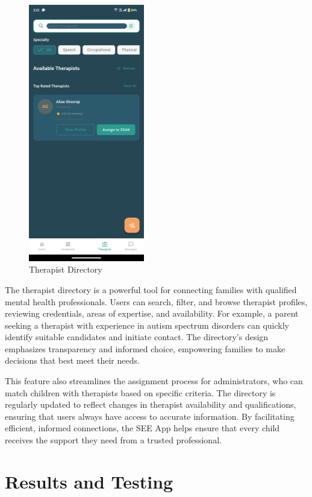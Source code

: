 \documentclass[12pt,a4paper]{article}
\newcommand{\chaptertitle}[1]{\section{#1}}
\begin{document}
\begin{figure}[H]
    \centering
    \includegraphics[width=0.45\textwidth]{Screenshots/therapists.png}
    \caption{Therapist Directory}
    \label{fig:therapists-directory}
\end{figure}
The therapist directory is a powerful tool for connecting families with qualified mental health professionals. Users can search, filter, and browse therapist profiles, reviewing credentials, areas of expertise, and availability. For example, a parent seeking a therapist with experience in autism spectrum disorders can quickly identify suitable candidates and initiate contact. The directory's design emphasizes transparency and informed choice, empowering families to make decisions that best meet their needs.

This feature also streamlines the assignment process for administrators, who can match children with therapists based on specific criteria. The directory is regularly updated to reflect changes in therapist availability and qualifications, ensuring that users always have access to accurate information. By facilitating efficient, informed connections, the SEE App helps ensure that every child receives the support they need from a trusted professional.

\newpage

\chaptertitle{Results and Testing}
\end{document}
